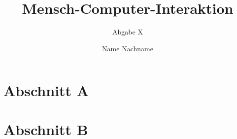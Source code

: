 \documentclass[a4paper,11pt]{scrartcl}
\title{\textbf{Mensch-Computer-Interaktion}}
\subtitle{Abgabe X}
\author{Name Nachname}
\begin{document}
  \begin{titlepage}
    \clearpage\maketitle
    \textcolor{hdm_red}{\hspace*{3cm}\makebox[\linewidth]{\rule{20cm}{3pt}}}
    \thispagestyle{empty}

  \end{titlepage}
 
  \clearpage\tableofcontents
  \thispagestyle{empty}

  \newpage
  \setcounter{page}{1}
 
 
  \section{Abschnitt A}
    \blindtext[2]
    \pagebreak

  \section{Abschnitt B}
    \blindtext[3]
\end{document}
